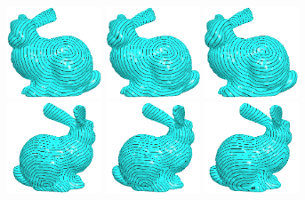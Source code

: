 \begin{figure}[htbp]
\centering
\includegraphics[width=0.25\textwidth]{figs/svg/bunny_SVG_small_front.png}
\includegraphics[width=0.25\textwidth]{figs/svg/bunny_GTU_1k_front.png}
\includegraphics[width=0.25\textwidth]{figs/svg/bunny_heat_front.png}\\
\includegraphics[width=0.25\textwidth]{figs/svg/bunny_SVG_small_back.png}
\includegraphics[width=0.25\textwidth]{figs/svg/bunny_GTU_1k_back.png}
\includegraphics[width=0.25\textwidth]{figs/svg/bunny_heat_back.png}\\

\end{figure}
